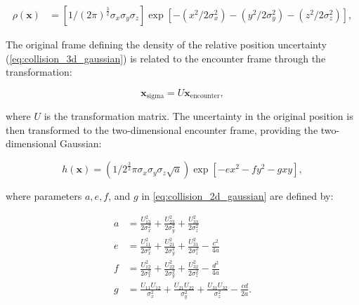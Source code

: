 \begin{equation}
    \begin{aligned}
        \rho(\boldsymbol{x}) & =\left[1 /(2 \pi)^{\frac{3}{2}} \sigma_{x} \sigma_{y} \sigma_{z}\right] \exp \left[-\left(x^{2} / 2 \sigma_{x}^{2}\right)-\left(y^{2} / 2 \sigma_{y}^{2}\right)-\left(z^{2} / 2 \sigma_{z}^{2}\right)\right],
    \end{aligned}
    \label{eq:collision_3d_gaussian}
\end{equation}

The original frame defining the density of the relative position uncertainty (\autoref{eq:collision_3d_gaussian}) is related to the encounter frame through the transformation:

\begin{equation}
    \boldsymbol{x}_{\text {sigma}}=U \boldsymbol{x}_{\text {encounter}},
\end{equation}

where $U$ is the transformation matrix. The uncertainty in the original position is then transformed to the two-dimensional encounter frame, providing the two-dimensional Gaussian:

\begin{equation}
    h(\boldsymbol{x})=\left(1 / 2^{\frac{3}{2}} \pi \sigma_{x} \sigma_{y} \sigma_{z} \sqrt{a}\right) \exp \left[-e x^{2}-f y^{2}-g x y\right],
    \label{eq:collision_2d_gaussian}
\end{equation}

where parameters $a, e, f$, and $g$ in \autoref{eq:collision_2d_gaussian} are defined by:

\begin{equation}
    \begin{aligned}
        a & =\frac{U_{13}^{2}}{2 \sigma_{x}^{2}}+\frac{U_{23}^{2}}{2 \sigma_{y}^{2}}+\frac{U_{33}^{2}}{2 \sigma_{z}^{2}}                     \\
        e & =\frac{U_{11}^{2}}{2 \sigma_{x}^{2}}+\frac{U_{21}^{2}}{2 \sigma_{y}^{2}}+\frac{U_{31}^{2}}{2 \sigma_{z}^{2}}-\frac{c^{2}}{4 a}   \\
        f & =\frac{U_{12}^{2}}{2 \sigma_{x}^{2}}+\frac{U_{22}^{2}}{2 \sigma_{y}^{2}}+\frac{U_{32}^{2}}{2 \sigma_{z}^{2}}-\frac{d^{2}}{4 a}   \\
        g & =\frac{U_{11} U_{12}}{\sigma_{x}^{2}}+\frac{U_{21} U_{22}}{\sigma_{y}^{2}}+\frac{U_{31} U_{32}}{\sigma_{z}^{2}}-\frac{c d}{2 a}.
    \end{aligned}
    \label{eq:collision_2d_gaussian:params1}
\end{equation}

